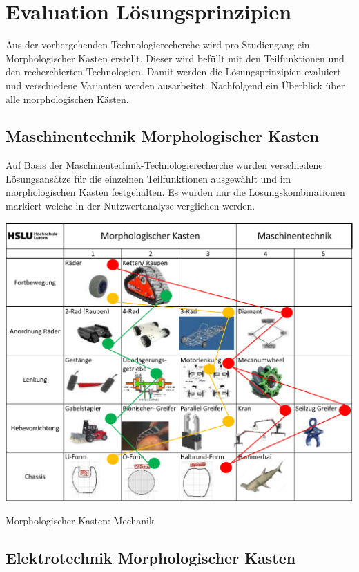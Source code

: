 \section{Evaluation Lösungsprinzipien}

Aus der vorhergehenden Technologierecherche wird pro Studiengang ein Morphologischer Kasten erstellt. Dieser wird befüllt mit den Teilfunktionen und den recherchierten Technologien. Damit werden die Lösungsprinzipien evaluiert und verschiedene Varianten werden ausarbeitet. Nachfolgend ein Überblick über alle morphologischen Kästen.

\subsection{Maschinentechnik Morphologischer Kasten}

Auf Basis der Maschinentechnik-Technologierecherche wurden verschiedene Lösungsansätze für die einzelnen Teilfunktionen ausgewählt und im morphologischen Kasten festgehalten. Es wurden nur die Lösungskombinationen markiert welche in der Nutzwertanalyse verglichen werden.  

\begin{table}[H]
\centering
\includegraphics[width=\textwidth]{assets/MK_Maschinentechnik.pdf}
\caption{Morphologischer Kasten: Mechanik}
\label{table:mk-mechanik}
\end{table}


\subsection{Elektrotechnik Morphologischer Kasten}

